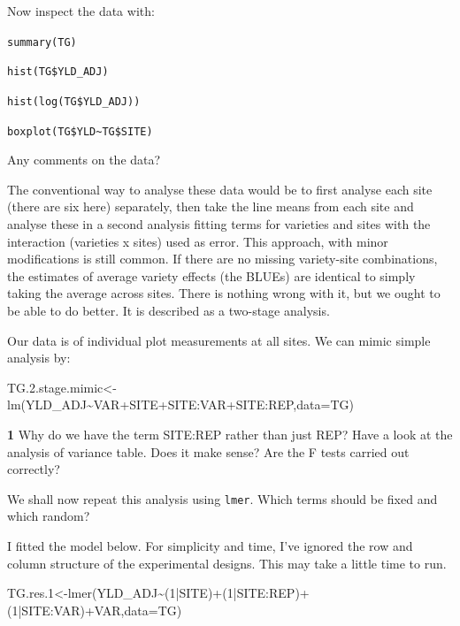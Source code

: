 \documentclass[
]{book}
\makeatletter
\newenvironment{Shaded}{\begin{snugshade}}{\end{snugshade}}
\newcommand{\AttributeTok}[1]{\textcolor[rgb]{0.77,0.63,0.00}{#1}}
\newcommand{\DecValTok}[1]{\textcolor[rgb]{0.00,0.00,0.81}{#1}}
\newcommand{\FloatTok}[1]{\textcolor[rgb]{0.00,0.00,0.81}{#1}}
\newcommand{\FunctionTok}[1]{\textcolor[rgb]{0.00,0.00,0.00}{#1}}
\newcommand{\NormalTok}[1]{#1}
\newcommand{\OtherTok}[1]{\textcolor[rgb]{0.56,0.35,0.01}{#1}}
\newcommand{\SpecialCharTok}[1]{\textcolor[rgb]{0.00,0.00,0.00}{#1}}
\newenvironment{kframe}{%
\medskip{}
\setlength{\fboxsep}{.8em}
 \def\at@end@of@kframe{}%
 \ifinner\ifhmode%
  \def\at@end@of@kframe{\end{minipage}}%
  \begin{minipage}{\columnwidth}%
 \fi\fi%
 \def\FrameCommand##1{\hskip\@totalleftmargin \hskip-\fboxsep
 \colorbox{shadecolor}{##1}\hskip-\fboxsep
     \hskip-\linewidth \hskip-\@totalleftmargin \hskip\columnwidth}%
 \MakeFramed {\advance\hsize-\width
   \@totalleftmargin\z@ \linewidth\hsize
   \@setminipage}}%
 {\par\unskip\endMakeFramed%
 \at@end@of@kframe}
\newenvironment{rmdblock}[1]
  {
  \begin{itemize}
  \renewcommand{\labelitemi}{
    \raisebox{-.7\height}[0pt][0pt]{
      {\setkeys{Gin}{width=3em,keepaspectratio}\texttt{[image: images/\#1]}}
    }
  }
  \setlength{\fboxsep}{1em}
  \begin{kframe}
  \item
  }
  {
  \end{kframe}
  \end{itemize}
  }
\newenvironment{rmdquiz}
  {\begin{rmdblock}{quiz}}
  {\end{rmdblock}}
\makeatother
\begin{document}
Now inspect the data with:

\texttt{summary(TG)}

\texttt{hist(TG\$YLD\_ADJ)}

\texttt{hist(log(TG\$YLD\_ADJ))}

\texttt{boxplot(TG\$YLD\textasciitilde{}TG\$SITE)}

Any comments on the data?

The conventional way to analyse these data would be to first analyse each site (there are six here) separately, then take the line means from each site and analyse these in a second analysis fitting terms for varieties and sites with the interaction (varieties x sites) used as error. This approach, with minor modifications is still common. If there are no missing variety-site combinations, the estimates of average variety effects (the BLUEs) are identical to simply taking the average across sites. There is nothing wrong with it, but we ought to be able to do better. It is described as a two-stage analysis.

Our data is of individual plot measurements at all sites. We can mimic simple analysis by:

\begin{Shaded}
\begin{Highlighting}[]
\NormalTok{TG.}\FloatTok{2.}\NormalTok{stage.mimic}\OtherTok{\textless{}{-}}\FunctionTok{lm}\NormalTok{(YLD\_ADJ}\SpecialCharTok{\textasciitilde{}}\NormalTok{VAR}\SpecialCharTok{+}\NormalTok{SITE}\SpecialCharTok{+}\NormalTok{SITE}\SpecialCharTok{:}\NormalTok{VAR}\SpecialCharTok{+}\NormalTok{SITE}\SpecialCharTok{:}\NormalTok{REP,}\AttributeTok{data=}\NormalTok{TG)}
\end{Highlighting}
\end{Shaded}

\begin{rmdquiz}
\textbf{1} Why do we have the term SITE:REP rather than just REP?
Have a look at the analysis of variance table. Does it make sense? Are the F tests carried out correctly?
\end{rmdquiz}

We shall now repeat this analysis using \texttt{lmer}. Which terms should be fixed and which random?

I fitted the model below. For simplicity and time, I've ignored the row and column structure of the experimental designs. This may take a little time to run.

\begin{Shaded}
\begin{Highlighting}[]
\NormalTok{TG.res}\FloatTok{.1}\OtherTok{\textless{}{-}}\FunctionTok{lmer}\NormalTok{(YLD\_ADJ}\SpecialCharTok{\textasciitilde{}}\NormalTok{(}\DecValTok{1}\SpecialCharTok{|}\NormalTok{SITE)}\SpecialCharTok{+}\NormalTok{(}\DecValTok{1}\SpecialCharTok{|}\NormalTok{SITE}\SpecialCharTok{:}\NormalTok{REP)}\SpecialCharTok{+}\NormalTok{(}\DecValTok{1}\SpecialCharTok{|}\NormalTok{SITE}\SpecialCharTok{:}\NormalTok{VAR)}\SpecialCharTok{+}\NormalTok{VAR,}\AttributeTok{data=}\NormalTok{TG)}
\end{Highlighting}
\end{Shaded}
\end{document}

